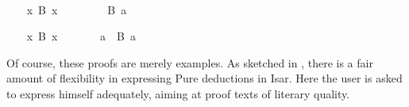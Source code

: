 \begin{isabellebody}
\begin{minipage}[t]{0.4\textwidth}
%
\end{minipage}\\[3ex]\begin{minipage}[t]{0.4\textwidth}
\isanewline
\ \ \isamarkupfalse%
\ {}{}x{}\ B\ x{}\isanewline
\ \ \isamarkupfalse%
\isanewline
\ \ \ \ \isamarkupfalse%
\ {}B\ a{}%
\endisatagproof
{\isafoldproof}%
%
\isadelimproof
%
\endisadelimproof
%
\isadelimnoproof
\ %
\endisadelimnoproof
%
\isatagnoproof
{}\isamarkupfalse%
%
\endisatagnoproof
{\isafoldnoproof}%
%
\isadelimnoproof
\isanewline
%
\endisadelimnoproof
%
\isadelimproof
\ \ %
\endisadelimproof
%
\isatagproof
{}\isamarkupfalse%
%
\end{minipage}\qquad\begin{minipage}[t]{0.4\textwidth}
\isanewline
\ \ \isamarkupfalse%
\ {}{}x{}\ B\ x{}%
\endisatagproof
{\isafoldproof}%
%
\isadelimproof
%
\endisadelimproof
%
\isadelimnoproof
\ %
\endisadelimnoproof
%
\isatagnoproof
{}\isamarkupfalse%
%
\endisatagnoproof
{\isafoldnoproof}%
%
\isadelimnoproof
\isanewline
%
\endisadelimnoproof
%
\isadelimproof
\ \ %
\endisadelimproof
%
\isatagproof
{}\isamarkupfalse%
\ \isamarkupfalse%
\ a\ \ {}B\ a{}\ \isamarkupfalse%
%
\end{minipage}
%
\endisatagproof
{\isafoldproof}%
%
\isadelimproof
%
\endisadelimproof
%
\begin{isamarkuptext}%
\bigskip\noindent Of course, these proofs are merely examples.  As
  sketched in , there is a fair amount
  of flexibility in expressing Pure deductions in Isar.  Here the user
  is asked to express himself adequately, aiming at proof texts of
  literary quality.%
\end{isamarkuptext}%
\isamarkuptrue%
%
\isadelimvisible
%
\endisadelimvisible
%
\isatagvisible
{}\isamarkupfalse%
%
\endisatagvisible
{\isafoldvisible}%
%
\isadelimvisible
%
\endisadelimvisible
\isanewline
\end{isabellebody}%

